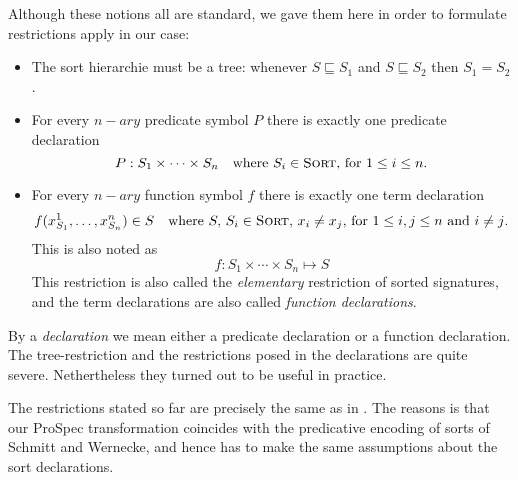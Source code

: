 \documentclass[fleqn]{scrartcl}
\newcommand{\prospec}{\textsf{ProSpec}\xspace}
\newcommand{\sort}{\textsc{Sort}\xspace}
\begin{document}
Although these notions all are standard, we gave them here in order to
formulate  restrictions apply in our case:
\begin{itemize}
\item The sort hierarchie must be a tree: whenever $S \sqsubseteq
   S_1$ and $S \sqsubseteq S_2$ then $S_1 = S_2$. 
\item For every $n-ary$ predicate symbol $P$ there is exactly one
  predicate declaration
  \begin{displaymath}
    P : S_1 \times \cdots \times S_n\quad \text{where $S_i
      \in \sort$, for $1 \leq i \leq n$.}
  \end{displaymath}
\item For every $n-ary$ function symbol $f$ there is exactly one
  term declaration
  \begin{displaymath}
    f(x^1_{S_1},\ldots,x^n_{S_n}) \in S \quad\text{where  $S,\,S_i
      \in \sort$, $x_i \neq x_j$, for $1
      \leq i,j \leq n$ and $i \neq j$.}
  \end{displaymath}
This is also noted as
\begin{displaymath}
  f: S_1 \times \cdots \times S_n \mapsto S
\end{displaymath}
This restriction is also called the {\em elementary\/} restriction of sorted
signatures, and the term declarations are also called {\em function
declarations\/}. 
\end{itemize}
By a {\em declaration\/} we mean either a predicate declaration or a
function declaration. The tree-restriction and the restrictions posed
in the declarations are quite severe. Nethertheless they turned out to
be useful in practice. 

The restrictions stated so far are precisely the same as in
\cite{Schmitt:Wernecke:TableauSortedLogics:89}. The reasons is that
our \prospec transformation coincides with the predicative encoding of
sorts of Schmitt and Wernecke, and hence has to make the same
assumptions about the sort declarations.
 
\end{document}
